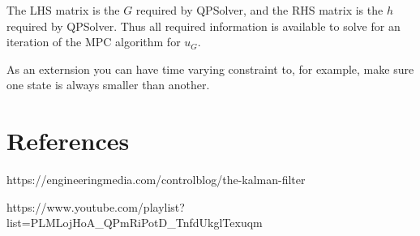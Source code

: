 \documentclass{article}
\begin{document}
The LHS matrix is the $G$ required by QPSolver, and the RHS matrix is the $h$ required by QPSolver. Thus all required
information is available to solve for an iteration of the MPC algorithm for $u_G$.

As an externsion you can have time varying constraint to, for example, make sure one state is always smaller than
another.

\section{References}

https://engineeringmedia.com/controlblog/the-kalman-filter

https://www.youtube.com/playlist?list=PLMLojHoA\_QPmRiPotD\_TnfdUkglTexuqm
\end{document}
